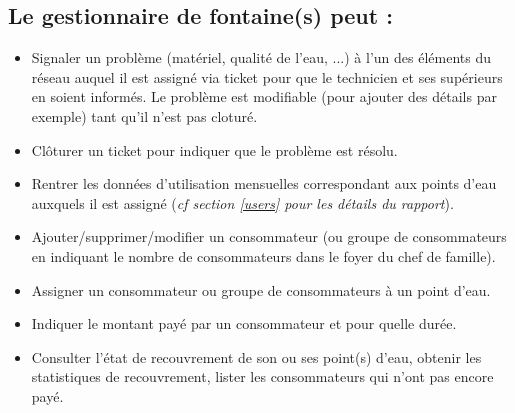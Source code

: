 \documentclass[a4paper, 11pt]{article}
\begin{document}
\subsection{Le gestionnaire de fontaine(s) peut :}
\begin{itemize}
  \item Signaler un problème (matériel, qualité de l'eau, ...) à l'un des éléments du réseau auquel il est assigné via ticket pour que le technicien et ses supérieurs en soient informés. Le problème est modifiable (pour ajouter des détails par exemple) tant qu'il n'est pas cloturé.
  \item Clôturer un ticket pour indiquer que le problème est résolu.
  \item Rentrer les données d'utilisation mensuelles correspondant aux points d'eau auxquels il est assigné (\emph{cf section \ref{users} pour les détails du rapport}).
  \item Ajouter/supprimer/modifier un consommateur (ou groupe de consommateurs en indiquant le nombre de consommateurs dans le foyer du chef de famille).
  \item Assigner un consommateur ou groupe de consommateurs à un point d'eau.
  \item Indiquer le montant payé par un consommateur et pour quelle durée.
  \item Consulter l'état de recouvrement de son ou ses point(s) d'eau, obtenir les statistiques de recouvrement, lister les consommateurs qui n'ont pas encore payé.
\end{itemize}

\end{document}
